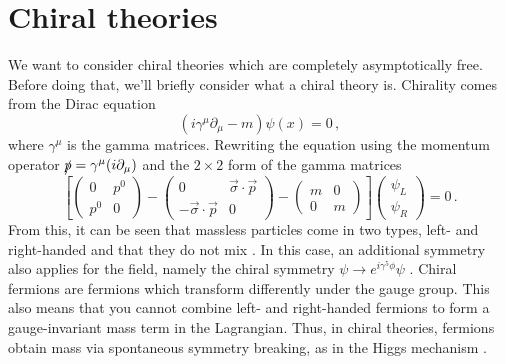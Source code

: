 \section{Chiral theories}
We want to consider chiral theories which are completely asymptotically free. Before doing that, we'll briefly consider what a chiral theory is. Chirality comes from the Dirac equation 
\begin{equation}
    (i\gamma^\mu \partial_\mu - m)\psi (x) =0\,,
\end{equation}
where $\gamma^\mu$ is the gamma matrices.  Rewriting the equation using the momentum operator $\slashed{p}=\gamma^\mu(i\partial_\mu)$ and the $2\times 2$ form of the gamma matrices
\begin{equation}
\left[ 
\begin{pmatrix}
0 & p^0 \\
p^0 & 0
\end{pmatrix}
- 
\begin{pmatrix}
0 & \vec\sigma \cdot \vec p \\
-\vec \sigma \cdot\vec{p}  & 0
\end{pmatrix}
- 
\begin{pmatrix}
m & 0 \\
0 & m
\end{pmatrix}
\right]
\begin{pmatrix}
\psi_L \\
\psi_R
\end{pmatrix}
= 0\,.
\end{equation}
From this, it can be seen that massless particles come in two types, left- and right-handed and that they do not mix \cite{Lancaster:2014}. In this case, an additional symmetry also applies for the field, namely the chiral symmetry $\psi\to e^{i\gamma^5\phi}\psi$ \cite{Zee:2010}. Chiral fermions are fermions which transform differently under the gauge group. This also means that you cannot combine left- and right-handed fermions to form a gauge-invariant mass term in the Lagrangian. Thus, in chiral theories, fermions obtain mass via spontaneous symmetry breaking, as in the Higgs mechanism \cite{Peskin:1995ev}.

